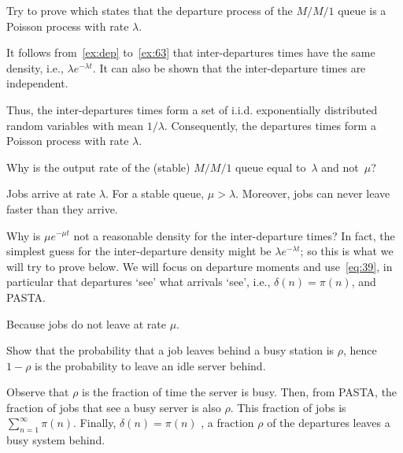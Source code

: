 \begin{exercise}\label{ex:burke}
  Try to prove  which states that the departure process of the $M/M/1$ queue is a Poisson process with rate $\lambda$.
\begin{solution}
  It follows from~\cref{ex:dep} to~\cref{ex:63} that inter-departures times have the same density, i.e., $\lambda e^{-\lambda t}$.
  It can also be shown that the inter-departure times are independent.

Thus, the inter-departures times form a set of i.i.d.
exponentially distributed random variables with mean $1/\lambda$.
Consequently, the departures times form a Poisson process with rate $\lambda$.

\end{solution}
\end{exercise}



\begin{extra}\label{ex:dep}
Why is the output rate of the (stable) $M/M/1$ queue equal to~$\lambda$ and not~$\mu$?
\begin{solution}
Jobs arrive at rate $\lambda$. For a stable queue, $\mu>\lambda$. Moreover,  jobs can never leave faster than they arrive.
\end{solution}
\end{extra}


\begin{extra}
  Why is $\mu e^{-\mu t}$ not a reasonable density for the inter-departure times?
  In fact, the simplest guess for the inter-departure density might be $\lambda e^{-\lambda t}$; so this is what we will try to prove below.
We will focus on departure moments and use~\cref{eq:39}, in particular that departures `see' what arrivals `see', i.e., $\delta(n)= \pi(n)$, and PASTA.
\begin{solution}
         Because jobs do not leave at rate $\mu$. 
\end{solution}
\end{extra}




\begin{extra}\label{ex:28}
Show that the probability that a job leaves behind a busy station is $\rho$, hence $1-\rho$ is the probability to leave an idle server behind.
\begin{solution}
Observe that $\rho$ is the fraction of time the server is busy. Then, from  PASTA, the fraction of jobs that see a busy server is also $\rho$.  This fraction of jobs is $\sum_{n=1}^\infty \pi(n)$. Finally, $\delta(n) = \pi(n)$ , a fraction $\rho$ of the departures leaves a busy system behind.

\end{solution}
\end{extra}


